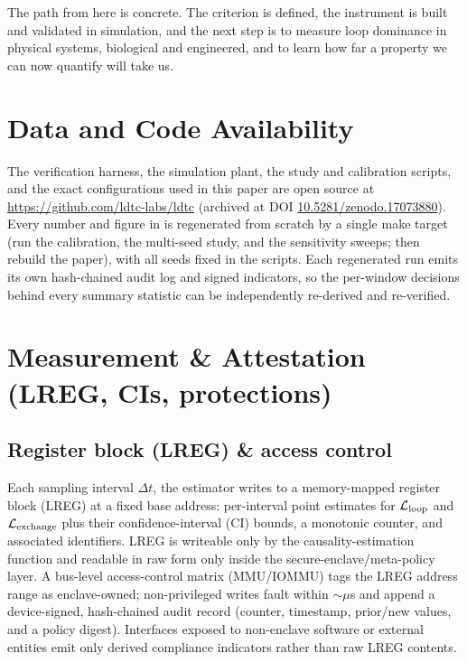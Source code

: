 \documentclass[11pt]{article}
\begin{document}
The path from here is concrete. The criterion is defined, the instrument is built and validated in simulation, and the next step is to measure loop dominance in physical systems, biological and engineered, and to learn how far a property we can now quantify will take us.

\section*{Data and Code Availability}
\label{sec:availability}

The verification harness, the simulation plant, the study and calibration scripts, and the exact configurations used in this paper are open source at \url{https://github.com/ldtc-labs/ldtc} (archived at DOI \href{https://doi.org/10.5281/zenodo.17073880}{10.5281/zenodo.17073880}). Every number and figure in  is regenerated from scratch by a single make target (run the calibration, the multi-seed study, and the sensitivity sweeps; then rebuild the paper), with all seeds fixed in the scripts. Each regenerated run emits its own hash-chained audit log and signed indicators, so the per-window decisions behind every summary statistic can be independently re-derived and re-verified.

\appendix

\section{Measurement \& Attestation (LREG, CIs, protections)}
\label{sec:methods_appendix}

\subsection{Register block (LREG) \& access control}

Each sampling interval $\Delta t$, the estimator writes to a memory-mapped register block (LREG) at a fixed base address: per-interval point estimates for $\mathcal{L}_{\text{loop}}$ and $\mathcal{L}_{\text{exchange}}$ plus their confidence-interval (CI) bounds, a monotonic counter, and associated identifiers. LREG is writeable only by the causality-estimation function and readable in raw form only inside the secure-enclave/meta-policy layer. A bus-level access-control matrix (MMU/IOMMU) tags the LREG address range as enclave-owned; non-privileged writes fault within $\sim\mu$s and append a device-signed, hash-chained audit record (counter, timestamp, prior/new values, and a policy digest). Interfaces exposed to non-enclave software or external entities emit only derived compliance indicators rather than raw LREG contents.
\end{document}
